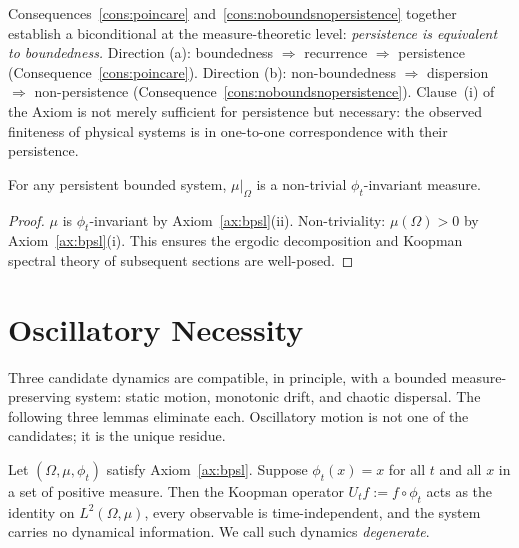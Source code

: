 \begin{remark}
Consequences~\ref{cons:poincare} and~\ref{cons:noboundsnopersistence}
together establish a biconditional at the measure-theoretic level:
\emph{persistence is equivalent to boundedness.}
Direction (a): boundedness $\Rightarrow$ recurrence $\Rightarrow$
persistence (Consequence~\ref{cons:poincare}).
Direction (b): non-boundedness $\Rightarrow$ dispersion $\Rightarrow$
non-persistence (Consequence~\ref{cons:noboundsnopersistence}).
Clause~(i) of the Axiom is not merely sufficient for persistence but
necessary: the observed finiteness of physical systems is in one-to-one
correspondence with their persistence.
\end{remark}

\begin{proposition}
\label{prop:nontriv}
For any persistent bounded system, $\mu|_{\Omega}$ is a non-trivial
$\phi_{t}$-invariant measure.
\end{proposition}

\begin{proof}
$\mu$ is $\phi_{t}$-invariant by Axiom~\ref{ax:bpsl}(ii).
Non-triviality: $\mu(\Omega)>0$ by Axiom~\ref{ax:bpsl}(i).
This ensures the ergodic decomposition and Koopman spectral theory of
subsequent sections are well-posed.
\end{proof}

\section{Oscillatory Necessity}
\label{sec:ch3-oscillatory}
\label{sec:oscillatory}

Three candidate dynamics are compatible, in principle, with a bounded
measure-preserving system: static motion, monotonic drift, and chaotic
dispersal.
The following three lemmas eliminate each.
Oscillatory motion is not one of the candidates; it is the unique residue.

\begin{lemma}
\label{lem:staticelim}
Let $(\Omega,\mu,\phi_{t})$ satisfy Axiom~\ref{ax:bpsl}.
Suppose $\phi_{t}(x)=x$ for all $t$ and all $x$ in a set of positive
measure.
Then the Koopman operator $U_{t}f:=f\circ\phi_{t}$ acts as the identity
on $L^{2}(\Omega,\mu)$, every observable is time-independent, and the
system carries no dynamical information.
We call such dynamics \emph{degenerate}.
\end{lemma}

